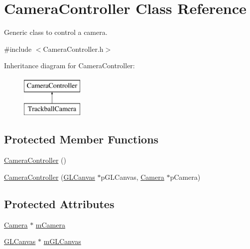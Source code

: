 \hypertarget{class_camera_controller}{\section{Camera\+Controller Class Reference}
\label{class_camera_controller}
}


Generic class to control a camera.  




{\ttfamily \#include $<$Camera\+Controller.\+h$>$}

Inheritance diagram for Camera\+Controller\+:\begin{figure}[H]
\begin{center}
\leavevmode
\includegraphics[height=2.000000cm]{class_camera_controller}
\end{center}
\end{figure}
\subsection*{Protected Member Functions}
\begin{DoxyCompactItemize}
\item 
\hyperlink{class_camera_controller_ad0f7e32ab3bc7ccb06f3e479b0d0681a}{Camera\+Controller} ()
\item 
\hyperlink{class_camera_controller_ab6d7de00cea4df37025ee14165efbf08}{Camera\+Controller} (\hyperlink{class_g_l_canvas}{G\+L\+Canvas} $\ast$p\+G\+L\+Canvas, \hyperlink{class_camera}{Camera} $\ast$p\+Camera)
\end{DoxyCompactItemize}
\subsection*{Protected Attributes}
\begin{DoxyCompactItemize}
\item 
\hyperlink{class_camera}{Camera} $\ast$ \hyperlink{class_camera_controller_a1532badd6fe0da6b2504965ab8e0b0a0}{m\+Camera}
\item 
\hyperlink{class_g_l_canvas}{G\+L\+Canvas} $\ast$ \hyperlink{class_camera_controller_a4147c2aa9d233041e4fb5c9683dbdc0c}{m\+G\+L\+Canvas}
\end{DoxyCompactItemize}


